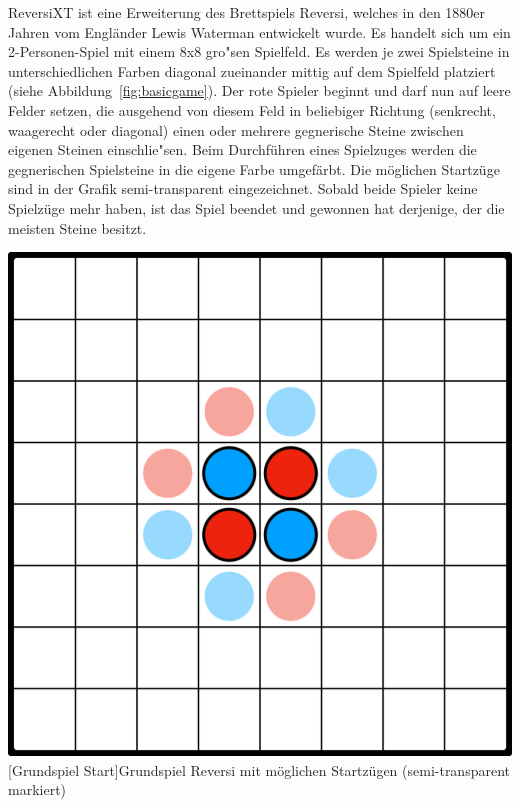 ReversiXT ist eine Erweiterung des Brettspiels Reversi, welches in den 1880er Jahren vom Engl\"ander Lewis Waterman entwickelt wurde.
Es handelt sich um ein 2-Personen-Spiel mit einem 8x8 gro"sen Spielfeld.
Es werden je zwei Spielsteine in unterschiedlichen Farben diagonal zueinander mittig auf dem Spielfeld platziert (siehe Abbildung~\ref{fig:basicgame}).
Der rote Spieler beginnt und darf nun auf leere Felder setzen, die ausgehend von diesem Feld in beliebiger Richtung (senkrecht, waagerecht oder diagonal) einen oder mehrere gegnerische Steine zwischen eigenen Steinen einschlie"sen.
Beim Durchf\"uhren eines Spielzuges werden die gegnerischen Spielsteine in die eigene Farbe umgef\"arbt.
Die m\"oglichen Startz\"uge sind in der Grafik semi-transparent eingezeichnet.
Sobald beide Spieler keine Spielz\"uge mehr haben, ist das Spiel beendet und gewonnen hat derjenige, der die meisten Steine besitzt.

\vspace{1em}
\begin{minipage}{\linewidth}
	\centering
	\includegraphics[width=0.5\linewidth]{pics/basicgame-start}
	[Grundspiel Start]{Grundspiel Reversi mit möglichen Startzügen (semi-transparent markiert)}
	\label{fig:basicgame}
\end{minipage}

